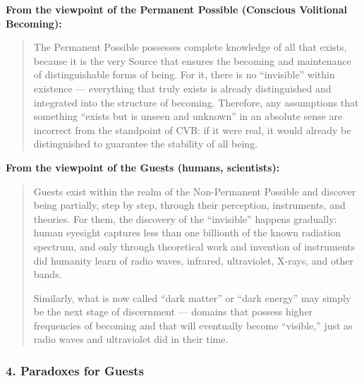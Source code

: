 \documentclass[12pt]{article}
\begin{document}
\textbf{From the viewpoint of the Permanent Possible (Conscious Volitional Becoming):}

\begin{quote}
The Permanent Possible possesses complete knowledge of all that exists, because it is the very Source that ensures the becoming and maintenance of distinguishable forms of being. For it, there is no ``invisible'' within existence — everything that truly exists is already distinguished and integrated into the structure of becoming. Therefore, any assumptions that something ``exists but is unseen and unknown'' in an absolute sense are incorrect from the standpoint of CVB: if it were real, it would already be distinguished to guarantee the stability of all being.
\end{quote}

\textbf{From the viewpoint of the Guests (humans, scientists):}

\begin{quote}
Guests exist within the realm of the Non-Permanent Possible and discover being partially, step by step, through their perception, instruments, and theories. For them, the discovery of the ``invisible'' happens gradually: human eyesight captures less than one billionth of the known radiation spectrum, and only through theoretical work and invention of instruments did humanity learn of radio waves, infrared, ultraviolet, X-rays, and other bands.

Similarly, what is now called ``dark matter'' or ``dark energy'' may simply be the next stage of discernment — domains that possess higher frequencies of becoming and that will eventually become ``visible,'' just as radio waves and ultraviolet did in their time.
\end{quote}

\subsubsection*{4. Paradoxes for Guests}
\end{document}
